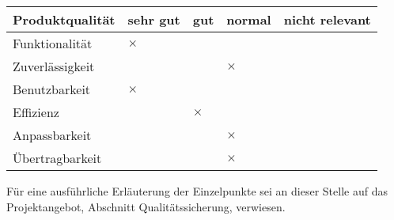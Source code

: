 \begin{table}[!h]
  \sffamily
  \begin{tabular}{l l l l l}
    \toprule
    \textbf{Produktqualität} & \textbf{sehr gut} & \textbf{gut} & \textbf{normal} & \textbf{nicht relevant} \\\midrule

    Funktionalität & $\times$ \\
    Zuverlässigkeit &&& $\times$ \\
    Benutzbarkeit &  $\times$ \\
    Effizienz  && $\times$ \\
    Anpassbarkeit &&& $\times$ \\
    Übertragbarkeit &&& $\times$ \\
    \bottomrule
  \end{tabular}
\end{table}

Für eine ausführliche Erläuterung der Einzelpunkte sei an dieser Stelle auf das Projektangebot, Abschnitt Qualitätssicherung, verwiesen.


